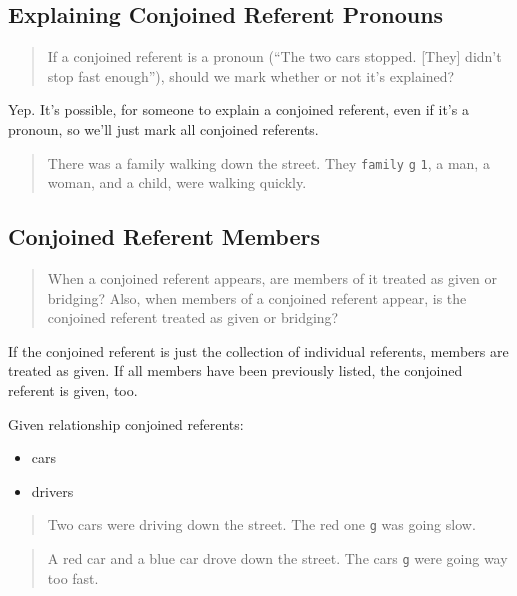 \documentclass[
]{book}
\providecommand{\tightlist}{%
  \setlength{\itemsep}{0pt}\setlength{\parskip}{0pt}}
\begin{document}
\hypertarget{explaining-conjoined-referent-pronouns}{%
\subsection{Explaining Conjoined Referent Pronouns}\label{explaining-conjoined-referent-pronouns}}

\begin{quote}
If a conjoined referent is a pronoun
(``The two cars stopped. {[}They{]} didn't stop fast enough''),
should we mark whether or not it's explained?
\end{quote}

Yep.
It's possible, for someone to explain a conjoined referent, even if it's a pronoun, so we'll just mark all conjoined referents.

\begin{quote}
There was a family walking down the street.
They \texttt{family} \texttt{g} \texttt{1}, a man, a woman, and a child, were walking quickly.
\end{quote}

\hypertarget{conjoined-referent-members}{%
\subsection{Conjoined Referent Members}\label{conjoined-referent-members}}

\begin{quote}
When a conjoined referent appears, are members of it treated as given or bridging?
Also, when members of a conjoined referent appear, is the conjoined referent treated as given or bridging?
\end{quote}

If the conjoined referent is just the collection of individual referents, members are treated as given.
If all members have been previously listed, the conjoined referent is given, too.

Given relationship conjoined referents:

\begin{itemize}
\tightlist
\item
  cars
\item
  drivers
\end{itemize}

\begin{quote}
Two cars were driving down the street.
The red one \texttt{g} was going slow.
\end{quote}

\begin{quote}
A red car and a blue car drove down the street.
The cars \texttt{g} were going way too fast.
\end{quote}
\end{document}
